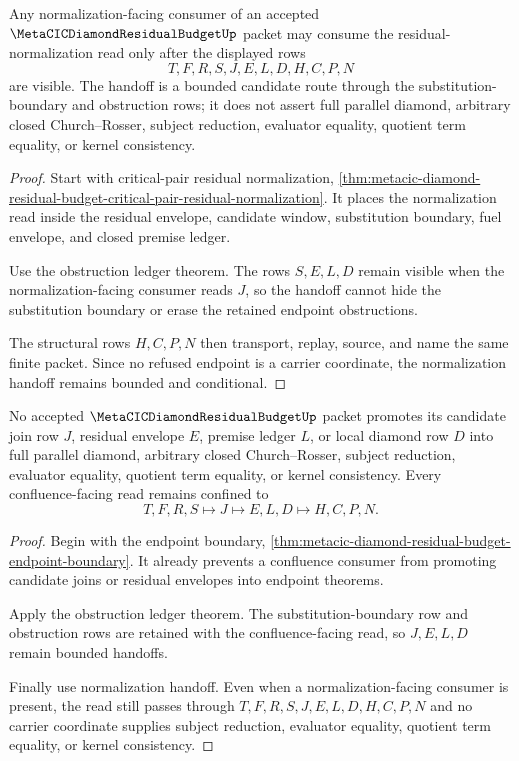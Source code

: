 \begin{theorem}
\label{thm:metacic-diamond-residual-budget-normalization-handoff}
Any normalization-facing consumer of an accepted $\MetaCICDiamondResidualBudgetUp$ packet may consume the residual-normalization read only after the displayed rows
$$
T,F,R,S,J,E,L,D,H,C,P,N
$$
are visible. The handoff is a bounded candidate route through the substitution-boundary and obstruction rows; it does not assert full parallel diamond, arbitrary closed Church--Rosser, subject reduction, evaluator equality, quotient term equality, or kernel consistency.
\end{theorem}
\begin{proof}
Start with critical-pair residual normalization, \autoref{thm:metacic-diamond-residual-budget-critical-pair-residual-normalization}. It places the normalization read inside the residual envelope, candidate window, substitution boundary, fuel envelope, and closed premise ledger.

Use the obstruction ledger theorem. The rows $S,E,L,D$ remain visible when the normalization-facing consumer reads $J$, so the handoff cannot hide the substitution boundary or erase the retained endpoint obstructions.

The structural rows $H,C,P,N$ then transport, replay, source, and name the same finite packet. Since no refused endpoint is a carrier coordinate, the normalization handoff remains bounded and conditional.
\end{proof}

\begin{theorem}
\label{thm:metacic-diamond-residual-budget-confluence-refusal}
No accepted $\MetaCICDiamondResidualBudgetUp$ packet promotes its candidate join row $J$, residual envelope $E$, premise ledger $L$, or local diamond row $D$ into full parallel diamond, arbitrary closed Church--Rosser, subject reduction, evaluator equality, quotient term equality, or kernel consistency. Every confluence-facing read remains confined to
$$
T,F,R,S \longmapsto J \longmapsto E,L,D \longmapsto H,C,P,N .
$$
\end{theorem}
\begin{proof}
Begin with the endpoint boundary, \autoref{thm:metacic-diamond-residual-budget-endpoint-boundary}. It already prevents a confluence consumer from promoting candidate joins or residual envelopes into endpoint theorems.

Apply the obstruction ledger theorem. The substitution-boundary row and obstruction rows are retained with the confluence-facing read, so $J,E,L,D$ remain bounded handoffs.

Finally use normalization handoff. Even when a normalization-facing consumer is present, the read still passes through $T,F,R,S,J,E,L,D,H,C,P,N$ and no carrier coordinate supplies subject reduction, evaluator equality, quotient term equality, or kernel consistency.
\end{proof}


